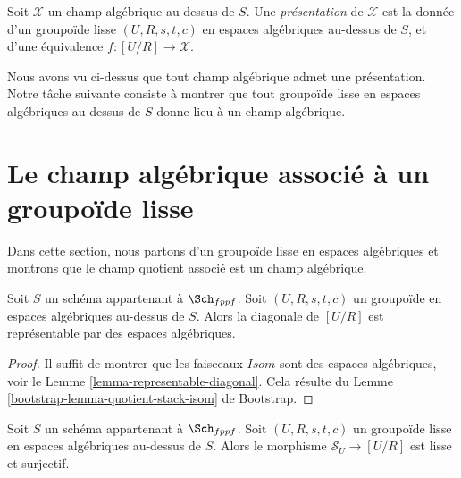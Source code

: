 \begin{definition}
\label{definition-presentation}
Soit $\mathcal{X}$ un champ algébrique au-dessus de $S$.
Une {\it présentation} de $\mathcal{X}$ est la donnée d'un groupoïde lisse
$(U, R, s, t, c)$ en espaces algébriques au-dessus de $S$, et d'une
équivalence $f : [U/R] \to \mathcal{X}$.
\end{definition}

\noindent
Nous avons vu ci-dessus que tout champ algébrique admet une présentation.
Notre tâche suivante consiste à montrer que tout groupoïde lisse en espaces
algébriques au-dessus de $S$ donne lieu à un champ algébrique.


\section{Le champ algébrique associé à un groupoïde lisse}
\label{section-smooth-groupoid-gives-algebraic-stack}

\noindent
Dans cette section, nous partons d'un groupoïde lisse en espaces algébriques
et montrons que le champ quotient associé est un champ algébrique.

\begin{lemma}
\label{lemma-diagonal-quotient-stack}
Soit $S$ un schéma appartenant à $\Sch_{fppf}$.
Soit $(U, R, s, t, c)$ un groupoïde en espaces algébriques au-dessus de $S$.
Alors la diagonale de $[U/R]$ est représentable par des espaces algébriques.
\end{lemma}

\begin{proof}
Il suffit de montrer que les faisceaux $\mathit{Isom}$ sont des espaces
algébriques, voir le
Lemme \ref{lemma-representable-diagonal}.
Cela résulte du
Lemme \ref{bootstrap-lemma-quotient-stack-isom} de Bootstrap.
\end{proof}

\begin{lemma}
\label{lemma-smooth-quotient-smooth-presentation}
Soit $S$ un schéma appartenant à $\Sch_{fppf}$.
Soit $(U, R, s, t, c)$ un groupoïde lisse en espaces algébriques au-dessus de $S$.
Alors le morphisme $\mathcal{S}_U \to [U/R]$ est lisse et surjectif.
\end{lemma}


